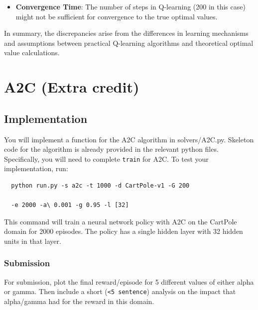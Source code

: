 \documentclass[a4paper]{article}
\theoremstyle{definition}
\newenvironment{soln}{
    \leavevmode\color{blue}\ignorespaces
}{}
\begin{document}
\begin{enumerate}
\begin{soln}
\begin{itemize}
    \item \textbf{Convergence Time}: The number of steps in Q-learning (200 in this case) might not be sufficient for convergence to the true optimal values.
    \end{itemize}

    In summary, the discrepancies arise from the differences in learning mechanisms and assumptions between practical Q-learning algorithms and theoretical optimal value calculations.

\end{soln}

\section{A2C (Extra credit)}
\subsection{Implementation}

You will implement a function for the A2C algorithm in solvers/A2C.py.
% 
Skeleton code for the algorithm is already provided in the relevant python files.
% 
Specifically, you will need to complete \verb|train| for A2C.
% 
To test your implementation, run:
% 
\begin{verbatim}
  python run.py -s a2c -t 1000 -d CartPole-v1 -G 200 
  
  -e 2000 -a\ 0.001 -g 0.95 -l [32]
\end{verbatim}
% 
This command will train a neural network policy with A2C on the CartPole domain for 2000 episodes.
% 
The policy has a single hidden layer with 32 hidden units in that layer.
\subsubsection*{Submission}
% 

For submission, plot the final reward/episode for 5 different values of either alpha or gamma. Then include a short (\verb|<5 sentence|) analysis on the impact that alpha/gamma had for the reward in this domain.



\end{enumerate}
\end{document}
